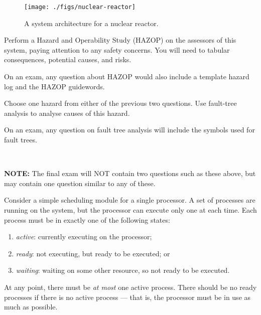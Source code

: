 \begin{figure}[!h]
\centering
\texttt{[image: ./figs/nuclear-reactor]}
\caption{A system architecture for a nuclear reactor.}
\label{fig:nuclear-reactor}
\end{figure}

Perform a Hazard and Operability Study (HAZOP) on the assessors of this system, paying attention to any safety concerns. You will need to tabular consequences, potential causes, and risks. 

On an exam, any question about HAZOP would also include a template hazard log and the HAZOP guidewords.




Choose one hazard from either of the previous two questions. Use fault-tree analysis to analyse causes of this hazard.

On an exam,  any question on fault tree analysis will include the symbols used for fault trees.

~

{\bf NOTE:} The final exam will NOT contain two questions such as these above, but may contain one question similar to any of these.





Consider a simple scheduling module for a single processor. A set of processes are running on the system, but the processor can execute only one at each time. Each process must be in exactly one of the following states:

\begin{enumerate}

 \item \emph{active}: currently executing on the processor;

 \item \emph{ready}: not executing, but ready to be executed; or

 \item \emph{waiting}: waiting on some other resource, so not ready to be executed.

\end{enumerate}

At any point, there must be \emph{at most} one active process. There should be no ready processes if there is no active process --- that is, the processor must be in use as much as possible.




